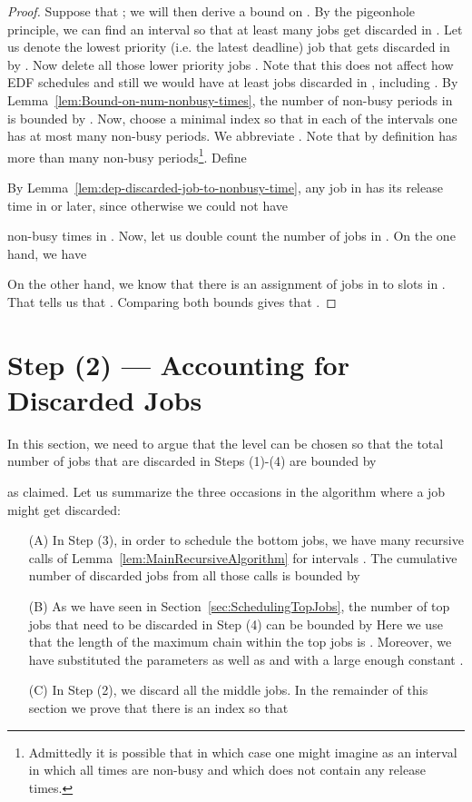 \documentclass[11pt,letterpaper,oneside,english]{article}
\theoremstyle{theorem}
\begin{document}
\begin{proof}
Suppose that ; we will
then derive
a bound on .
By the pigeonhole principle, we can find an interval 
so that
at least  many jobs get discarded in .
Let us denote the lowest priority (i.e. the latest deadline) job
that gets discarded in  by . Now delete all those lower priority
jobs . Note that this does not affect how EDF schedules
 and still we would have at least  jobs discarded in
, including .
By Lemma~\ref{lem:Bound-on-num-nonbusy-times},
the number of non-busy periods in 
is bounded by . Now, choose a minimal index  so that in
each of the
intervals  one has at most  many non-busy
periods.
We abbreviate . Note that
by definition  has more than  many non-busy
periods\footnote{Admittedly it is possible that  in which
case one might imagine  as an interval in which all times are
non-busy and which does not contain any release times.}.
Define

By Lemma~\ref{lem:dep-discarded-job-to-nonbusy-time}, any job in  has
its release time in  or later, since otherwise we could not have

non-busy times in . Now, let us double count the number of
jobs in .
On the one hand, we have

On the other hand, we know that there is an assignment  of jobs
in  to slots in . That tells us that .
Comparing both bounds gives that .
\end{proof}










\section{Step (2) --- Accounting for Discarded Jobs}\label{sec:AccountingDiscardedJobs}

In this section, we need to argue that the level  can be chosen so that the total 
number of jobs that are discarded in Steps (1)-(4) are bounded by

as claimed. 
Let us summarize the three occasions in the algorithm where a job might get discarded: 
\begin{enumerate}
\item[(A)] In Step (3), in order to schedule the bottom jobs, 
we have  many recursive calls of Lemma~\ref{lem:MainRecursiveAlgorithm}
for intervals . The cumulative number of discarded jobs from all those calls
is bounded by

\item[(B)] As we have seen in Section~\ref{sec:SchedulingTopJobs}, the number of top jobs that 
need to be discarded in Step (4) can be bounded by 
Here we use that the length of the maximum chain within the top jobs is .
Moreover, we have substituted the parameters 
as well as   and  with a large enough constant .
\item[(C)] In Step (2), we discard all the middle jobs. In the remainder of this section we prove 
that there is an index  so that 

\end{enumerate}
\end{document}
